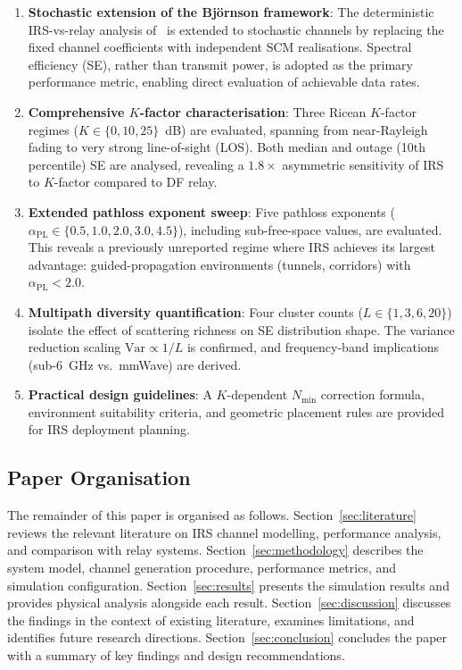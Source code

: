 \documentclass[journal]{IEEEtran} %
\begin{document}
\begin{enumerate}
    \item \textbf{Stochastic extension of the Bj\"{o}rnson framework}: The deterministic IRS-vs-relay analysis of~\cite{bjornson2020irs} is extended to stochastic channels by replacing the fixed channel coefficients with independent SCM realisations. Spectral efficiency (SE), rather than transmit power, is adopted as the primary performance metric, enabling direct evaluation of achievable data rates.

    \item \textbf{Comprehensive $K$-factor characterisation}: Three Ricean $K$-factor regimes ($K \in \{0, 10, 25\}$~dB) are evaluated, spanning from near-Rayleigh fading to very strong line-of-sight (LOS). Both median and outage (10th percentile) SE are analysed, revealing a $1.8\times$ asymmetric sensitivity of IRS to $K$-factor compared to DF relay.

    \item \textbf{Extended pathloss exponent sweep}: Five pathloss exponents ($\alpha_{\mathrm{PL}} \in \{0.5, 1.0, 2.0, 3.0, 4.5\}$), including sub-free-space values, are evaluated. This reveals a previously unreported regime where IRS achieves its largest advantage: guided-propagation environments (tunnels, corridors) with $\alpha_{\mathrm{PL}} < 2.0$.

    \item \textbf{Multipath diversity quantification}: Four cluster counts ($L \in \{1, 3, 6, 20\}$) isolate the effect of scattering richness on SE distribution shape. The variance reduction scaling $\mathrm{Var} \propto 1/L$ is confirmed, and frequency-band implications (sub-6~GHz vs.\ mmWave) are derived.

    \item \textbf{Practical design guidelines}: A $K$-dependent $N_{\mathrm{min}}$ correction formula, environment suitability criteria, and geometric placement rules are provided for IRS deployment planning.
\end{enumerate}

\subsection{Paper Organisation}

The remainder of this paper is organised as follows. Section~\ref{sec:literature} reviews the relevant literature on IRS channel modelling, performance analysis, and comparison with relay systems. Section~\ref{sec:methodology} describes the system model, channel generation procedure, performance metrics, and simulation configuration. Section~\ref{sec:results} presents the simulation results and provides physical analysis alongside each result. Section~\ref{sec:discussion} discusses the findings in the context of existing literature, examines limitations, and identifies future research directions. Section~\ref{sec:conclusion} concludes the paper with a summary of key findings and design recommendations.
\end{document}
